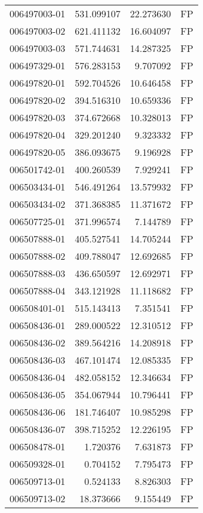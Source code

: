 \begin{tabular}{lrrl}
006497003-01 &  531.099107 &    22.273630 &   FP \\
006497003-02 &  621.411132 &    16.604097 &   FP \\
006497003-03 &  571.744631 &    14.287325 &   FP \\
006497329-01 &  576.283153 &     9.707092 &   FP \\
006497820-01 &  592.704526 &    10.646458 &   FP \\
006497820-02 &  394.516310 &    10.659336 &   FP \\
006497820-03 &  374.672668 &    10.328013 &   FP \\
006497820-04 &  329.201240 &     9.323332 &   FP \\
006497820-05 &  386.093675 &     9.196928 &   FP \\
006501742-01 &  400.260539 &     7.929241 &   FP \\
006503434-01 &  546.491264 &    13.579932 &   FP \\
006503434-02 &  371.368385 &    11.371672 &   FP \\
006507725-01 &  371.996574 &     7.144789 &   FP \\
006507888-01 &  405.527541 &    14.705244 &   FP \\
006507888-02 &  409.788047 &    12.692685 &   FP \\
006507888-03 &  436.650597 &    12.692971 &   FP \\
006507888-04 &  343.121928 &    11.118682 &   FP \\
006508401-01 &  515.143413 &     7.351541 &   FP \\
006508436-01 &  289.000522 &    12.310512 &   FP \\
006508436-02 &  389.564216 &    14.208918 &   FP \\
006508436-03 &  467.101474 &    12.085335 &   FP \\
006508436-04 &  482.058152 &    12.346634 &   FP \\
006508436-05 &  354.067944 &    10.796441 &   FP \\
006508436-06 &  181.746407 &    10.985298 &   FP \\
006508436-07 &  398.715252 &    12.226195 &   FP \\
006508478-01 &    1.720376 &     7.631873 &   FP \\
006509328-01 &    0.704152 &     7.795473 &   FP \\
006509713-01 &    0.524133 &     8.826303 &   FP \\
006509713-02 &   18.373666 &     9.155449 &   FP \\

\end{tabular}
